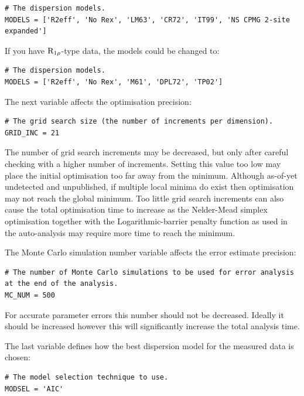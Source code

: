 \begin{lstlisting}[firstnumber=14]
# The dispersion models.
MODELS = ['R2eff', 'No Rex', 'LM63', 'CR72', 'IT99', 'NS CPMG 2-site expanded']
\end{lstlisting}

If you have $\mathrm{R}_{1\rho}$-type data, the models could be changed to:

\begin{lstlisting}[numbers=none]
# The dispersion models.
MODELS = ['R2eff', 'No Rex', 'M61', 'DPL72', 'TP02']
\end{lstlisting}

The next variable affects the optimisation precision:

\begin{lstlisting}[firstnumber=17]
# The grid search size (the number of increments per dimension).
GRID_INC = 21
\end{lstlisting}

The number of grid search increments may be decreased, but only after careful checking with a higher number of increments.  Setting this value too low may place the initial optimisation too far away from the minimum.  Although as-of-yet undetected and unpublished, if multiple local minima do exist then optimisation may not reach the global minimum.  Too little grid search increments can also cause the total optimisation time to increase as the Nelder-Mead simplex optimisation together with the Logarithmic-barrier penalty function as used in the auto-analysis may require more time to reach the minimum.

The Monte Carlo simulation number  variable affects the error estimate precision:

\begin{lstlisting}[firstnumber=20]
# The number of Monte Carlo simulations to be used for error analysis at the end of the analysis.
MC_NUM = 500
\end{lstlisting}

For accurate parameter errors this number should not be decreased.  Ideally it should be increased however this will significantly increase the total analysis time.

The last variable defines how the best dispersion model for the measured data is chosen:

\begin{lstlisting}[firstnumber=23]
# The model selection technique to use.
MODSEL = 'AIC'
\end{lstlisting}

